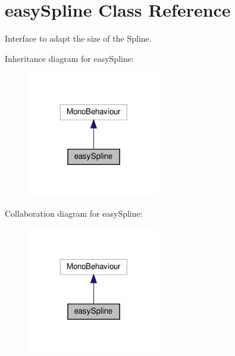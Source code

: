 \hypertarget{classeasySpline}{}\section{easy\+Spline Class Reference}
\label{classeasySpline}


Interface to adapt the size of the Spline.  




Inheritance diagram for easy\+Spline\+:\nopagebreak
\begin{figure}[H]
\begin{center}
\leavevmode
\includegraphics[width=164pt]{classeasySpline__inherit__graph}
\end{center}
\end{figure}


Collaboration diagram for easy\+Spline\+:\nopagebreak
\begin{figure}[H]
\begin{center}
\leavevmode
\includegraphics[width=164pt]{classeasySpline__coll__graph}
\end{center}
\end{figure}
